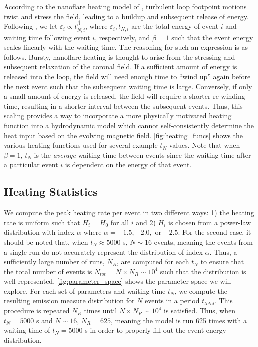 \documentclass[preprint,linenumbers]{aastex}
\begin{document}
	\par According to the nanoflare heating model of \citet{parker_nanoflares_1988}, turbulent loop footpoint motions twist and stress the field, leading to a buildup and subsequent release of energy. Following \citet{cargill_active_2014}, we let $\varepsilon_i\propto t_{N,i}^{\beta}$, where $\varepsilon_i,t_{N,i}$ are the total energy of event $i$ and waiting time following event $i$, respectively, and $\beta=1$ such that the event energy scales linearly with the waiting time. The reasoning for such an expression is as follows. Bursty, nanoflare heating is thought to arise from the stressing and subsequent relaxation of the coronal field. If a sufficient amount of energy is released into the loop, the field will need enough time to ``wind up'' again before the next event such that the subsequent waiting time is large. Conversely, if only a small amount of energy is released, the field will require a shorter re-winding time, resulting in a shorter interval between the subsequent events. Thus, this scaling provides a way to incorporate a more physically motivated heating function into a hydrodynamic model which cannot self-consistently determine the heat input based on the evolving magnetic field. \autoref{fig:heating_funcs} shows the various heating functions used for several example $t_N$ values. Note that when $\beta=1$, $t_N$ is the \textit{average} waiting time between events since the waiting time after a particular event $i$ is dependent on the energy of that event.
	\subsection{Heating Statistics}
	\label{subsec:heating_stats}
	\par We compute the peak heating rate per event in two different ways: 1) the heating rate is uniform such that $H_i=H_0$ for all $i$ and 2) $H_i$ is chosen from a power-law distribution with index $\alpha$ where $\alpha=-1.5,-2.0,$ or $-2.5$. For the second case, it should be noted that, when $t_N\approx5000$ s, $N\sim16$ events, meaning the events from a single run do not accurately represent the distribution of index $\alpha$. Thus, a sufficiently large number of runs, $N_{R}$, are computed for each $t_N$ to ensure that the total number of events is $N_{tot}=N\times N_{R}\sim10^4$ such that the distribution is well-represented. \autoref{fig:parameter_space} shows the parameter space we will explore. For each set of parameters and waiting time $t_N$, we compute the resulting emission measure distribution for $N$ events in a period $t_{total}$. This procedure is repeated $N_R$ times until $N\times N_R\sim10^4$ is satisfied. Thus, when $t_N=5000$ s and $N\sim16$, $N_R=625$, meaning the model is run 625 times with a waiting time of $t_N=5000$ s in order to properly fill out the event energy distribution.
\end{document}
